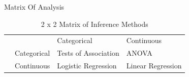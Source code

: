 \documentclass{article}\usepackage[]{graphicx}\usepackage[]{color}
\begin{document}
Matrix Of Analysis

\begin{table}
		\begin{tabular}{|l|l||ll|} 
		\hline
																																				& 									&	\multicol{2}{*}{Response}	&								\\ \hline
																																				&										& Categorical 					& Continuous 				\\ \hline \hline
	\parbox[t]{2mm}{} & Categorical 			& Tests of Association	& ANOVA 						\\ 
																																				& Continuous				&	Logistic Regression		& Linear Regression	\\ \hline
		\end{tabular}
	\caption{2 x 2 Matrix of Inference Methods}
	\label{tab:2X2MatrixOfInferenceMethods}
\end{table}
\end{document}
